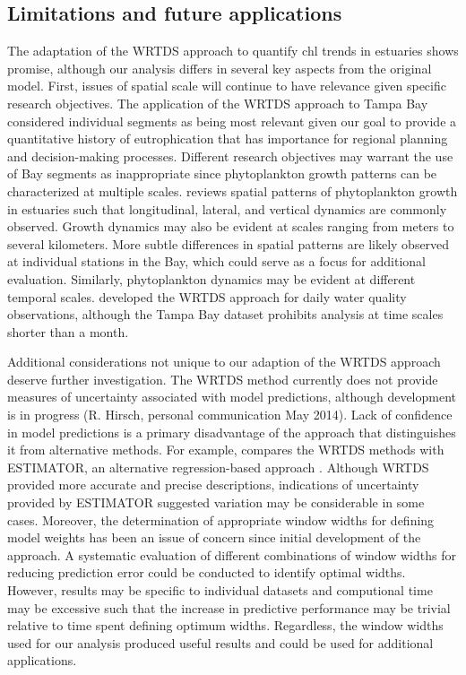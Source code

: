 \documentclass[letterpaper,12pt,oneside]{article}\usepackage{graphicx, color}
\begin{document}
\subsection{Limitations and future applications}

The adaptation of the \ac{WRTDS} approach to quantify \ac{chl} trends in estuaries shows promise, although our analysis differs in several key aspects from the original model.  First, issues of spatial scale will continue to have relevance given specific research objectives.  The application of the \ac{WRTDS} approach to Tampa Bay considered individual segments as being most relevant given our goal to provide a quantitative history of eutrophication that has importance for regional planning and decision-making processes.  Different research objectives may warrant the use of Bay segments as inappropriate since phytoplankton growth patterns can be characterized at multiple scales.  \citet{Cloern96} reviews spatial patterns of phytoplankton growth in estuaries such that longitudinal, lateral, and vertical dynamics are commonly observed.  Growth dynamics may also be evident at scales ranging from meters to several kilometers.  More subtle differences in spatial patterns are likely observed at individual stations in the Bay, which could serve as a focus for additional evaluation. Similarly, phytoplankton dynamics may be evident at different temporal scales.  \citet{Hirsch10} developed the \ac{WRTDS} approach for daily water quality observations, although the Tampa Bay dataset prohibits analysis at time scales shorter than a month.     

Additional considerations not unique to our adaption of the \ac{WRTDS} approach deserve further investigation.  The \ac{WRTDS} method currently does not provide measures of uncertainty associated with model predictions, although development is in progress (R. Hirsch, personal communication May 2014). Lack of confidence in model predictions is a primary disadvantage of the approach that distinguishes it from alternative methods.  For example, \citet{Moyer12} compares the \ac{WRTDS} methods with ESTIMATOR, an alternative regression-based approach \citep{Cohn92}.  Although \ac{WRTDS} provided more accurate and precise descriptions, indications of uncertainty provided by ESTIMATOR suggested variation may be considerable in some cases.  Moreover, the determination of appropriate window widths for defining model weights has been an issue of concern since initial development of the approach.  A systematic evaluation of different combinations of window widths for reducing prediction error could be conducted to identify optimal widths.  However, results may be specific to individual datasets and computional time may be excessive such that the increase in predictive performance may be trivial relative to time spent defining optimum widths.  Regardless, the window widths used for our analysis produced useful results and could be used for additional applications.
\end{document}
